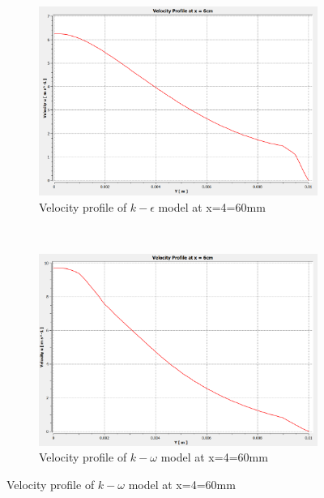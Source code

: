 \begin{figure}[H]
     ~
    \begin{subfigure}{.48\textwidth}
    \centering
    \includegraphics[width=.95\linewidth]{images/task2/task2-1/cs7.png}
    \caption{Velocity profile of $k-\epsilon$ model at x=4=60mm}
\end{subfigure}
    ~
    \begin{subfigure}{.48\textwidth}
    \centering
    \includegraphics[width=.95\linewidth]{images/task2/task2-2/cs7.png}
    \caption{Velocity profile of $k-\omega$ model at x=4=60mm}
\end{subfigure}




\end{figure}
